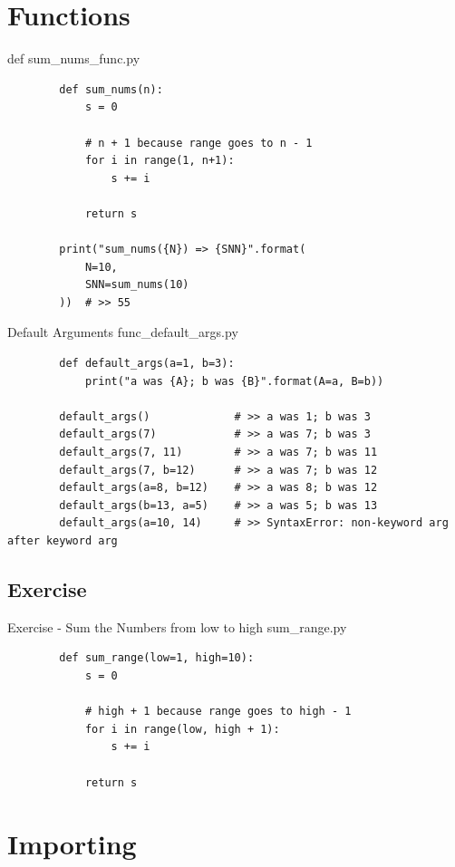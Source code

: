 \documentclass[11pt]{beamer}
\begin{document}
\section{Functions}
\begin{frame}[fragile]{def}
	sum\_nums\_func.py
	\begin{lstlisting}
		def sum_nums(n):
		    s = 0
		    
		    # n + 1 because range goes to n - 1
		    for i in range(1, n+1):
		        s += i
			
		    return s
		
		print("sum_nums({N}) => {SNN}".format(
		    N=10, 
		    SNN=sum_nums(10)
		))  # >> 55
	\end{lstlisting}
\end{frame}

\begin{frame}[fragile]{Default Arguments}
	func\_default\_args.py
	\begin{lstlisting}
		def default_args(a=1, b=3):
		    print("a was {A}; b was {B}".format(A=a, B=b))
		
		default_args()             # >> a was 1; b was 3
		default_args(7)            # >> a was 7; b was 3
		default_args(7, 11)        # >> a was 7; b was 11
		default_args(7, b=12)      # >> a was 7; b was 12
		default_args(a=8, b=12)    # >> a was 8; b was 12
		default_args(b=13, a=5)    # >> a was 5; b was 13
		default_args(a=10, 14)     # >> SyntaxError: non-keyword arg after keyword arg
	\end{lstlisting}
\end{frame}

\subsection{Exercise}
\begin{frame}[fragile]{Exercise - Sum the Numbers from low to high}
	sum\_range.py
	\pause
	\begin{lstlisting}
		def sum_range(low=1, high=10):
		    s = 0
		    
		    # high + 1 because range goes to high - 1
		    for i in range(low, high + 1):
		        s += i
			
		    return s
	\end{lstlisting}
\end{frame}

\section{Importing}
\end{document}
